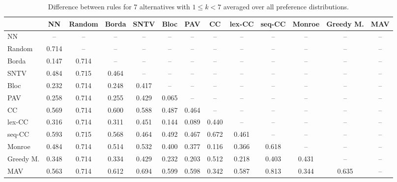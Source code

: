 
\begin{table*}[htbp]
\centering
\begin{tabular}{lcccccccccccc}
\toprule
 & NN & Random & Borda & SNTV & Bloc & PAV & CC & lex-CC & seq-CC & Monroe & Greedy M. & MAV \\
\midrule
NN & -- & -- & -- & -- & -- & -- & -- & -- & -- & -- & -- & -- \\
Random & \cellcolor{blue!71} 0.714 & -- & -- & -- & -- & -- & -- & -- & -- & -- & -- & -- \\
Borda & \cellcolor{blue!14} 0.147 & \cellcolor{blue!71} 0.714 & -- & -- & -- & -- & -- & -- & -- & -- & -- & -- \\
SNTV & \cellcolor{blue!48} 0.484 & \cellcolor{blue!71} 0.715 & \cellcolor{blue!46} 0.464 & -- & -- & -- & -- & -- & -- & -- & -- & -- \\
Bloc & \cellcolor{blue!23} 0.232 & \cellcolor{blue!71} 0.714 & \cellcolor{blue!24} 0.248 & \cellcolor{blue!41} 0.417 & -- & -- & -- & -- & -- & -- & -- & -- \\
PAV & \cellcolor{blue!25} 0.258 & \cellcolor{blue!71} 0.714 & \cellcolor{blue!25} 0.255 & \cellcolor{blue!42} 0.429 & \cellcolor{blue!6} 0.065 & -- & -- & -- & -- & -- & -- & -- \\
CC & \cellcolor{blue!56} 0.569 & \cellcolor{blue!71} 0.714 & \cellcolor{blue!60} 0.600 & \cellcolor{blue!58} 0.588 & \cellcolor{blue!48} 0.487 & \cellcolor{blue!46} 0.464 & -- & -- & -- & -- & -- & -- \\
lex-CC & \cellcolor{blue!31} 0.316 & \cellcolor{blue!71} 0.714 & \cellcolor{blue!31} 0.311 & \cellcolor{blue!45} 0.451 & \cellcolor{blue!14} 0.144 & \cellcolor{blue!8} 0.089 & \cellcolor{blue!44} 0.440 & -- & -- & -- & -- & -- \\
seq-CC & \cellcolor{blue!59} 0.593 & \cellcolor{blue!71} 0.715 & \cellcolor{blue!56} 0.568 & \cellcolor{blue!46} 0.464 & \cellcolor{blue!49} 0.492 & \cellcolor{blue!46} 0.467 & \cellcolor{blue!67} 0.672 & \cellcolor{blue!46} 0.461 & -- & -- & -- & -- \\
Monroe & \cellcolor{blue!48} 0.484 & \cellcolor{blue!71} 0.714 & \cellcolor{blue!51} 0.514 & \cellcolor{blue!53} 0.532 & \cellcolor{blue!40} 0.400 & \cellcolor{blue!37} 0.377 & \cellcolor{blue!11} 0.116 & \cellcolor{blue!36} 0.366 & \cellcolor{blue!61} 0.618 & -- & -- & -- \\
Greedy M. & \cellcolor{blue!34} 0.348 & \cellcolor{blue!71} 0.714 & \cellcolor{blue!33} 0.334 & \cellcolor{blue!42} 0.429 & \cellcolor{blue!23} 0.232 & \cellcolor{blue!20} 0.203 & \cellcolor{blue!51} 0.512 & \cellcolor{blue!21} 0.218 & \cellcolor{blue!40} 0.403 & \cellcolor{blue!43} 0.431 & -- & -- \\
MAV & \cellcolor{blue!56} 0.563 & \cellcolor{blue!71} 0.714 & \cellcolor{blue!61} 0.612 & \cellcolor{blue!69} 0.694 & \cellcolor{blue!59} 0.599 & \cellcolor{blue!59} 0.598 & \cellcolor{blue!34} 0.342 & \cellcolor{blue!58} 0.587 & \cellcolor{blue!81} 0.813 & \cellcolor{blue!34} 0.344 & \cellcolor{blue!63} 0.635 & -- \\
\bottomrule
\end{tabular}

\caption{Difference between rules for 7 alternatives with $1 \leq k < 7$ averaged over all preference distributions.}
\label{tab:rule_distance_heatmap-m=[7]-pref_dist=all}
\end{table*}
    